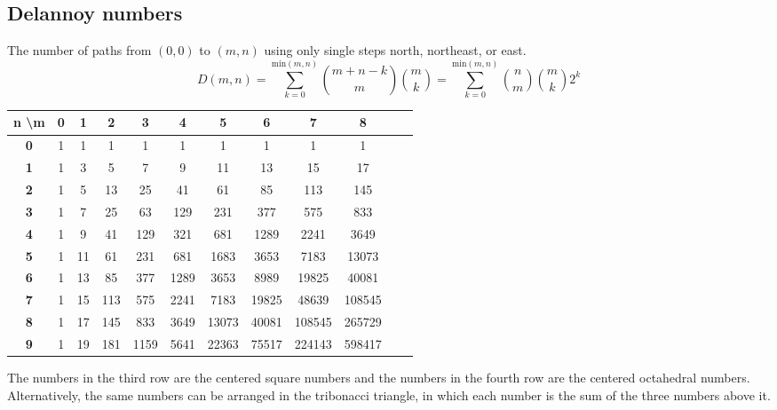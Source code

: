 

\subsection*{Delannoy numbers}

The number of paths from $(0, 0)$ to $(m, n)$ using only single steps north, northeast, or east.
$$D(m, n) = \sum_{k=0}^{\text{min}(m, n)} \binom{m+n-k}{m} \binom{m}{k} = \sum_{k=0}^{\text{min}(m, n)} \binom{n}{m} \binom{m}{k} 2^k$$

\begin{center}
    \begin{tabular}{|c|c|c|c|c|c|c|c|c|c|c|c|}
        \hline
        \textbf{n \textbackslash \text{ }m} & \textbf{0} & \textbf{1} & \textbf{2} & \textbf{3} & \textbf{4} & \textbf{5} & \textbf{6} & \textbf{7} & \textbf{8} \\
        \hline
        \textbf{0} & 1 & 1 & 1 & 1 & 1 & 1 & 1 & 1 & 1 \\
        \hline
        \textbf{1} & 1 & 3 & 5 & 7 & 9 & 11 & 13 & 15 & 17 \\
        \hline
        \textbf{2} & 1 & 5 & 13 & 25 & 41 & 61 & 85 & 113 & 145 \\
        \hline
        \textbf{3} & 1 & 7 & 25 & 63 & 129 & 231 & 377 & 575 & 833 \\
        \hline
        \textbf{4} & 1 & 9 & 41 & 129 & 321 & 681 & 1289 & 2241 & 3649 \\
        \hline
        \textbf{5} & 1 & 11 & 61 & 231 & 681 & 1683 & 3653 & 7183 & 13073 \\
        \hline
        \textbf{6} & 1 & 13 & 85 & 377 & 1289 & 3653 & 8989 & 19825 & 40081 \\
        \hline
        \textbf{7} & 1 & 15 & 113 & 575 & 2241 & 7183 & 19825 & 48639 & 108545 \\
        \hline
        \textbf{8} & 1 & 17 & 145 & 833 & 3649 & 13073 & 40081 & 108545 & 265729 \\
        \hline
        \textbf{9} & 1 & 19 & 181 & 1159 & 5641 & 22363 & 75517 & 224143 & 598417 \\
        \hline
    \end{tabular}
\end{center}

The numbers in the third row are the centered square numbers and the numbers in the fourth row are the centered octahedral numbers. Alternatively, the same numbers can be arranged in the tribonacci triangle, in which each number is the sum of the three numbers above it.

